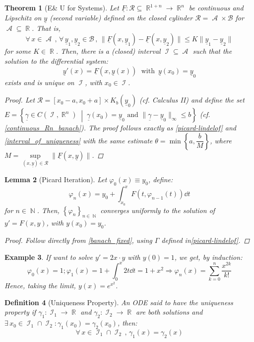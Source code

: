 \documentclass[12pt]{article}
\let\RA\Rightarrow
\newcommand{\set}[2]{\left\{{#1}\;\middle|\;{#2}\right\}}
\newcommand{\Forall}[1]{\forall\,{#1}\,,\,}
\newcommand{\Exist}[1]{\exists\,{#1}:}
\DeclareMathOperator{\R}{\mathbb{R}}
\DeclareMathOperator{\N}{\mathbb{N}}
\DeclareMathOperator{\I}{\mathcal{I}}
\DeclareMathOperator{\A}{\mathcal{A}}
\newcommand{\seq}[2][n]{{\left\{#2\right\}}_{#1\in\N}}
\newcommand{\tuple}[1]{\underline{#1}}
\newtheorem{theorem}{Theorem}[subsection]
\newtheorem{definition}[theorem]{Definition}
\newtheorem{lemma}[theorem]{Lemma}
\newtheorem{example}[theorem]{Example}
\begin{document}
\begin{theorem}[E\& U for Systems]
  \label{pl_systems}
  Let $\tuple{F}:\mathcal{R}\subseteq \R^{1+n}\to\R^n$ be continuous and Lipschitz on $\tuple{y}$ (second variable) defined on the closed cylinder $\mathcal{R}=\A\times\mathcal{B}$ for $\A\subseteq\R$. That is, $$\Forall{x\in\A}\Forall{\tuple{y}_1,\tuple{y}_2\in\mathcal{B}}\|\tuple{F}(x,\tuple{y}_1)-\tuple{F}(x,\tuple{y}_2)\|\leq K \|\tuple{y}_1-\tuple{y}_2\|$$ for some $K\in\R$. Then, there is a (closed) interval $\I\subseteq\A$ such that the solution to the differential system: $$\tuple{y}'(x)=\tuple{F}(x,\tuple{y}(x))\;\text{ with }\,\tuple{y}(x_0)=\tuple{y}_0$$ exists and is unique on $\I$, with $x_0\in\I$.
  \begin{proof}
    Let $\mathcal{R}=[x_0-a,x_0+a]\times K_b(\tuple{y}_0)$ (cf. Calculus II) and define the set $E=\set{\tuple{\gamma}\in C(\I,\R^n)}{\tuple{\gamma}(x_0)=\tuple{y}_0\text{ and }\|\tuple{\gamma}-\tuple{y}_0\|_\infty\leq b}$ (cf. \ref{continuous_Rn_banach}). The proof follows exactly as \ref{picard-lindelof} and \ref{interval_of_uniqueness} with the same estimate $\theta=\min\left\{a,\dfrac{b}{M}\right\}$, where $M=\sup\limits_{(x,\tuple{y})\in\mathcal{R}}\|\tuple{F}(x,\tuple{y})\|$.
  \end{proof}
\end{theorem}

\begin{lemma}[Picard Iteration]
  Let $\varphi_0(x)\equiv y_0$, define: $$\varphi_n(x)=y_0+\int_{x_0}^x F(t,\varphi_{n-1}(t))\dd{t}$$
  for $n\in\N$. Then, $\seq{\varphi_n}$ converges uniformly to the solution of $y'=F(x,y)$, with $y(x_0)=y_0$.
  \begin{proof}
    Follow directly from \ref{banach_fixed}, using $\Gamma$ defined in\ref{picard-lindelof}.
  \end{proof}
\end{lemma}

\begin{example}
  If want to solve $y'=2x\cdot y$ with $y(0)=1$, we get, by induction: $$\varphi_0(x)=1;\varphi_1(x)=1+\int_0^x 2t\dd{t}=1+x^2\RA\varphi_n(x)=\sum_{k=0}^n\frac{x^{2k}}{k!}$$
  Hence, taking the limit, $y(x)=e^{x^2}$.
\end{example}

\begin{definition}[Uniqueness Property]
  \label{def_uniqueness}
  An ODE said to have the uniqueness property if $\gamma_1:\I_1\to\R$ and $\gamma_2:\I_2\to\R$ are both solutions and $\Exist{x_0\in\I_1\cap\I_2}\gamma_1(x_0)=\gamma_2(x_0)$, then: $$\Forall{x\in\I_1\cap\I_2}\gamma_1(x)=\gamma_2(x)$$
\end{definition}
\end{document}
